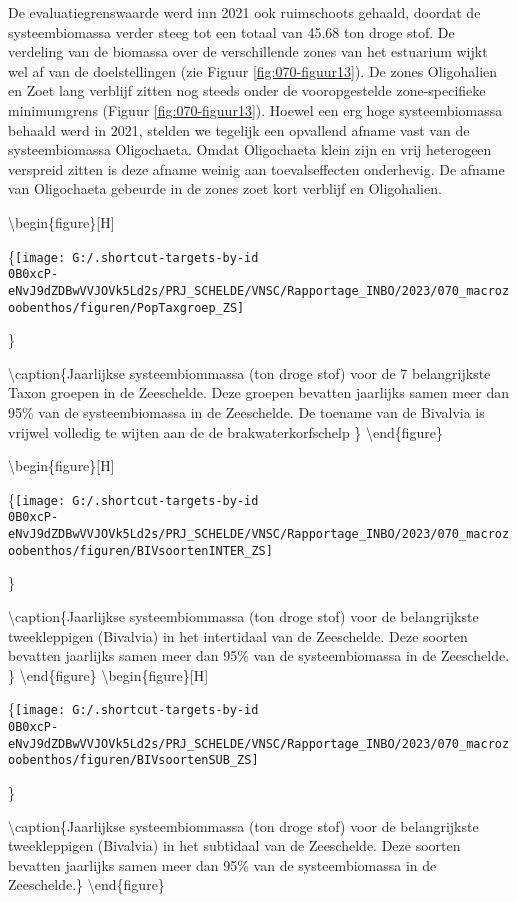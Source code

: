 \documentclass[twoside]{extreport}
\begin{document}
De evaluatiegrenswaarde werd inn 2021 ook ruimschoots gehaald, doordat
de systeembiomassa verder steeg tot een totaal van 45.68 ton droge stof.
De verdeling van de biomassa over de verschillende zones van het
estuarium wijkt wel af van de doelstellingen (zie Figuur
\ref{fig:070-figuur13}). De zones Oligohalien en Zoet lang verblijf
zitten nog steeds onder de vooropgestelde zone-specifieke minimumgrens
(Figuur \ref{fig:070-figuur13}). Hoewel een erg hoge systeembiomassa
behaald werd in 2021, stelden we tegelijk een opvallend afname vast van
de systeembiomassa Oligochaeta. Omdat Oligochaeta klein zijn en vrij
heterogeen verspreid zitten is deze afname weinig aan toevalseffecten
onderhevig. De afname van Oligochaeta gebeurde in de zones zoet kort
verblijf en Oligohalien.

\textbackslash begin\{figure\}{[}H{]}

\{\centering \texttt{[image: G:/.shortcut-targets-by-id\\0B0xcP-eNvJ9dZDBwVVJOVk5Ld2s/PRJ\_SCHELDE/VNSC/Rapportage\_INBO/2023/070\_macrozoobenthos/figuren/PopTaxgroep\_ZS]}

\}

\textbackslash caption\{Jaarlijkse systeembiommassa (ton droge stof)
voor de 7 belangrijkste Taxon groepen in de Zeeschelde. Deze groepen
bevatten jaarlijks samen meer dan 95\% van de systeembiomassa in de
Zeeschelde. De toename van de Bivalvia is vrijwel volledig te wijten aan
de de brakwaterkorfschelp \}\label{fig:070-figuur13b}
\textbackslash end\{figure\}

\textbackslash begin\{figure\}{[}H{]}

\{\centering \texttt{[image: G:/.shortcut-targets-by-id\\0B0xcP-eNvJ9dZDBwVVJOVk5Ld2s/PRJ\_SCHELDE/VNSC/Rapportage\_INBO/2023/070\_macrozoobenthos/figuren/BIVsoortenINTER\_ZS]}

\}

\textbackslash caption\{Jaarlijkse systeembiommassa (ton droge stof)
voor de belangrijkste tweekleppigen (Bivalvia) in het intertidaal van de
Zeeschelde. Deze soorten bevatten jaarlijks samen meer dan 95\% van de
systeembiomassa in de Zeeschelde. \}\label{fig:070-figuur13c}
\textbackslash end\{figure\} \textbackslash begin\{figure\}{[}H{]}

\{\centering \texttt{[image: G:/.shortcut-targets-by-id\\0B0xcP-eNvJ9dZDBwVVJOVk5Ld2s/PRJ\_SCHELDE/VNSC/Rapportage\_INBO/2023/070\_macrozoobenthos/figuren/BIVsoortenSUB\_ZS]}

\}

\textbackslash caption\{Jaarlijkse systeembiommassa (ton droge stof)
voor de belangrijkste tweekleppigen (Bivalvia) in het subtidaal van de
Zeeschelde. Deze soorten bevatten jaarlijks samen meer dan 95\% van de
systeembiomassa in de Zeeschelde.\}\label{fig:070-figuur13d}
\textbackslash end\{figure\}
\end{document}
